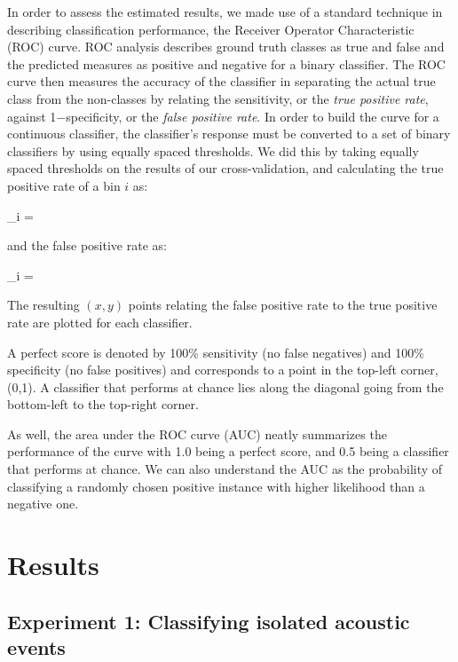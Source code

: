 \documentclass[a4paper,10pt,final]{ThesisStyle}
\begin{document}
In order to assess the estimated results, we made use of a standard technique in describing classification performance, the Receiver Operator Characteristic (ROC) curve.  ROC analysis describes ground truth classes as true and false and the predicted measures as positive and negative for a binary classifier.  The ROC curve then measures the accuracy of the classifier in separating the actual true class from the non-classes by relating the sensitivity, or the \textit{true positive rate}, against 1$-$specificity, or the \textit{false positive rate}.   In order to build the curve for a continuous classifier, the classifier's response must be converted to a set of binary classifiers by using equally spaced thresholds.  We did this by taking equally spaced thresholds on the results of our cross-validation, and calculating the true positive rate of a bin $i$ as: 

\begin{equationb}
_i = 
\end{equationb}

and the false positive rate as: 

\begin{equationb}
_i = 
\end{equationb}

The resulting $(x,y)$ points relating the false positive rate to the true positive rate are plotted for each classifier.

A perfect score is denoted by 100\% sensitivity (no false negatives) and 100\% specificity (no false positives) and corresponds to a point in the top-left corner, (0,1).  A classifier that performs at chance lies along the diagonal going from the bottom-left to the top-right corner.  

As well, the area under the ROC curve (AUC) neatly summarizes the performance of the curve with 1.0 being a perfect score, and 0.5 being a classifier that performs at chance.  We can also understand the AUC as the probability of classifying a randomly chosen positive instance with higher likelihood than a negative one.

\section{Results}

\subsection{Experiment 1: Classifying isolated acoustic events}
\end{document}
